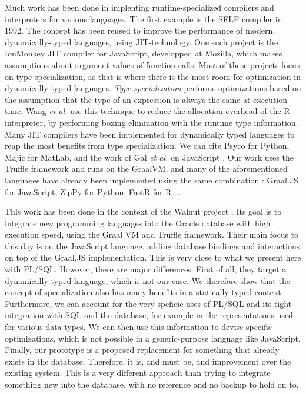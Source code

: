 \documentclass[twoside,11pt,a4paper]{article}
\newcommand{\etal}{\textit{et al.}}
\begin{document}

Much work has been done in implenting runtime-specialized compilers and interpreters for various languages. The first example is the SELF \cite{self} compiler in 1992. The concept has been reused to improve the performance of modern, dynamically-typed languages, using JIT-technology. One such project is the IonMonkey \cite{jsvalue} JIT compiler for JavaScript, developped at Mozilla, which makes assumptions about argument values of function calls. Most of these projects focus on type specialization, as that is where there is the most room for optimization in dynamically-typed languages. \textit{Type specialization} performs optimizations based on the assumption that the type of an expression is always the same at execution time. Wang \etal{} \cite{rspec} use this technique to reduce the allocation overhead of the R interpreter, by performing boxing elimination with the runtime type information. Many JIT compilers have been implemented for dynamically typed languages to reap the most benefits from type specialization. We can cite Psyco \cite{psyco} for Python, Majic \cite{majic} for MatLab, and the work of Gal \etal{} on JavaScript \cite{gal, gal2}. Our work uses the Truffle framework and runs on the GraalVM, and many of the aforementioned languages have already been implemented using the same combination : Graal.JS \cite{trufflespec} for JavaScript, ZipPy \cite{zippy} for Python, FastR \cite{fastr} for R ...

This work has been done in the context of the Walnut project \cite{walnuthome}. Its goal is to integrate new programming languages into the Oracle database with high execution speed, using the Graal VM and Truffle framework. Their main focus to this day is on the JavaScript language, adding database bindings and interactions on top of the Graal.JS implementation. This is very close to what we present here with PL/SQL. However, there are major differences. First of all, they target a dynamically-typed language, which is not our case. We therefore show that the concept of specialization also has many benefits in a statically-typed context. Furthermore, we can account for the very speficic uses of PL/SQL and its tight integration with SQL and the database, for example in the representations used for various data types. We can then use this information to devise specific optimizations, which is not possible in a generic-purpose language like JavaScript. Finally, our prototype is a proposed replacement for something that already exists in the database. Therefore, it is, and must be, and improvement over the existing system. This is a very different approach than trying to integrate something new into the database, with no reference and no backup to hold on to.
\end{document}
